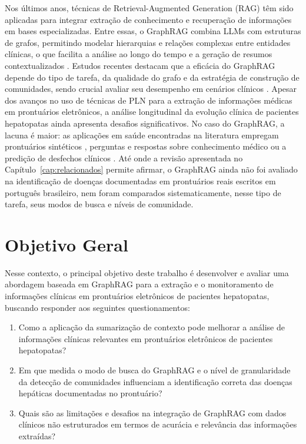 Nos últimos anos, técnicas de Retrieval-Augmented Generation (RAG)\citep{gao2024} têm sido aplicadas para integrar extração de conhecimento e recuperação de informações em bases especializadas. Entre essas, o GraphRAG combina LLMs com estruturas de grafos, permitindo modelar hierarquias e relações complexas entre entidades clínicas, o que facilita a análise ao longo do tempo e a geração de resumos contextualizados \citep{edge2024,xiang2025}. Estudos recentes destacam que a eficácia do GraphRAG depende do tipo de tarefa, da qualidade do grafo e da estratégia de construção de comunidades, sendo crucial avaliar seu desempenho em cenários clínicos \citep{xiang2025}. Apesar dos avanços no uso de técnicas de PLN para a extração de informações médicas em prontuários eletrônicos, a análise longitudinal da evolução clínica de pacientes hepatopatas ainda apresenta desafios significativos. No caso do GraphRAG, a lacuna é maior: as aplicações em saúde encontradas na literatura empregam prontuários sintéticos \citep{baptista2025}, perguntas e respostas sobre conhecimento médico \citep{wu2025,wang2026} ou a predição de desfechos clínicos \citep{kare2025}. Até onde a revisão apresentada no Capítulo~\ref{cap:relacionados} permite afirmar, o GraphRAG ainda não foi avaliado na identificação de doenças documentadas em prontuários reais escritos em português brasileiro, nem foram comparados sistematicamente, nesse tipo de tarefa, seus modos de busca e níveis de comunidade.

\section{Objetivo Geral}

 Nesse contexto, o principal objetivo deste trabalho é desenvolver e avaliar uma abordagem baseada em GraphRAG para a extração e o monitoramento de informações clínicas em prontuários eletrônicos de pacientes hepatopatas, buscando responder aos seguintes questionamentos:

\begin{enumerate}
    \item Como a aplicação da sumarização de contexto pode melhorar a análise de informações clínicas relevantes em prontuários eletrônicos de pacientes hepatopatas?
    \item Em que medida o modo de busca do GraphRAG e o nível de granularidade da detecção de comunidades influenciam a identificação correta das doenças hepáticas documentadas no prontuário?
    \item Quais são as limitações e desafios na integração de GraphRAG com dados clínicos não estruturados em termos de acurácia e relevância das informações extraídas?
\end{enumerate}

